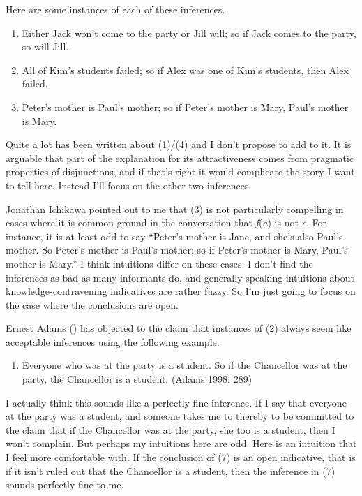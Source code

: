 \documentclass[
  11pt,
  letterpaper,
  DIV=11,
  numbers=noendperiod,
  twoside]{scrartcl}
\providecommand{\tightlist}{%
  \setlength{\itemsep}{0pt}\setlength{\parskip}{0pt}}
\begin{document}
Here are some instances of each of these inferences.

\begin{enumerate}
\def\labelenumi{\arabic{enumi}.}
\setcounter{enumi}{3}
\tightlist
\item
  Either Jack won't come to the party or Jill will; so if Jack comes to
  the party, so will Jill.
\item
  All of Kim's students failed; so if Alex was one of Kim's students,
  then Alex failed.
\item
  Peter's mother is Paul's mother; so if Peter's mother is Mary, Paul's
  mother is Mary.
\end{enumerate}

Quite a lot has been written about (1)/(4) and I don't propose to add to
it. It is arguable that part of the explanation for its attractiveness
comes from pragmatic properties of disjunctions, and if that's right it
would complicate the story I want to tell here. Instead I'll focus on
the other two inferences.

Jonathan Ichikawa pointed out to me that (3) is not particularly
compelling in cases where it is common ground in the conversation that
\emph{f}(\emph{a}) is not \emph{c}. For instance, it is at least odd to
say ``Peter's mother is Jane, and she's also Paul's mother. So Peter's
mother is Paul's mother; so if Peter's mother is Mary, Paul's mother is
Mary.'' I think intuitions differ on these cases. I don't find the
inferences as bad as many informants do, and generally speaking
intuitions about knowledge-contravening indicatives are rather fuzzy. So
I'm just going to focus on the case where the conclusions are open.

Ernest Adams () has objected to the claim
that instances of (2) always seem like acceptable inferences using the
following example.

\begin{enumerate}
\def\labelenumi{\arabic{enumi}.}
\setcounter{enumi}{6}
\tightlist
\item
  Everyone who was at the party is a student. So if the Chancellor was
  at the party, the Chancellor is a student. (Adams 1998: 289)
\end{enumerate}

I actually think this sounds like a perfectly fine inference. If I say
that everyone at the party was a student, and someone takes me to
thereby to be committed to the claim that if the Chancellor was at the
party, she too is a student, then I won't complain. But perhaps my
intuitions here are odd. Here is an intuition that I feel more
comfortable with. If the conclusion of (7) is an open indicative, that
is if it isn't ruled out that the Chancellor is a student, then the
inference in (7) sounds perfectly fine to me.
\end{document}
